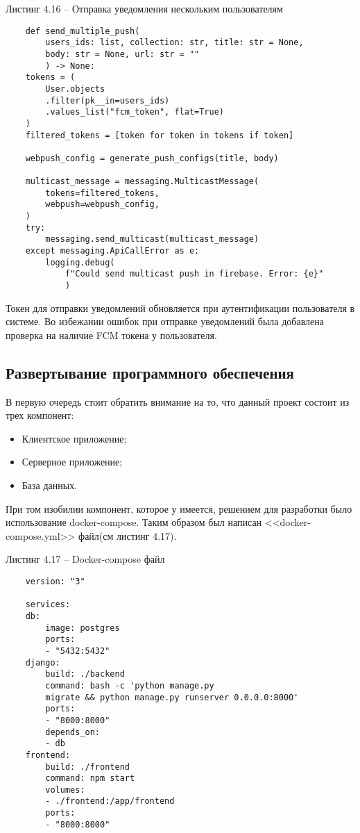 Листинг 4.16 – Отправка уведомления нескольким пользователям
\begin{lstlisting}
    def send_multiple_push(
        users_ids: list, collection: str, title: str = None,
        body: str = None, url: str = ""
        ) -> None:
    tokens = (
        User.objects
        .filter(pk__in=users_ids)
        .values_list("fcm_token", flat=True)
    )
    filtered_tokens = [token for token in tokens if token]

    webpush_config = generate_push_configs(title, body)

    multicast_message = messaging.MulticastMessage(
        tokens=filtered_tokens,
        webpush=webpush_config,
    )
    try:
        messaging.send_multicast(multicast_message)
    except messaging.ApiCallError as e:
        logging.debug(
            f"Could send multicast push in firebase. Error: {e}"
            )
\end{lstlisting}

Токен для отправки уведомлений обновляется при аутентификации пользователя в системе.
Во избежании ошибок при отправке уведомлений была добавлена проверка на наличие FCM токена у пользователя.

\subsection{Развертывание программного обеспечения}
В первую очередь стоит обратить внимание на то, что данный проект состоит из трех компонент:
\begin{itemize}
    \item Клиентское приложение;
    \item Серверное приложение;
    \item База данных.
\end{itemize}

При том изобилии компонент, которое у имеется, решением для разработки было использование docker-compose.
Таким образом был написан <<docker-compose.yml>> файл(см листинг 4.17).

Листинг 4.17 – Docker-compose файл
\begin{lstlisting}
    version: "3"

    services:
    db:
        image: postgres
        ports:
        - "5432:5432"
    django:
        build: ./backend
        command: bash -c 'python manage.py
        migrate && python manage.py runserver 0.0.0.0:8000'
        ports:
        - "8000:8000"
        depends_on:
        - db
    frontend:
        build: ./frontend
        command: npm start
        volumes:
        - ./frontend:/app/frontend
        ports:
        - "8000:8000"
\end{lstlisting}


